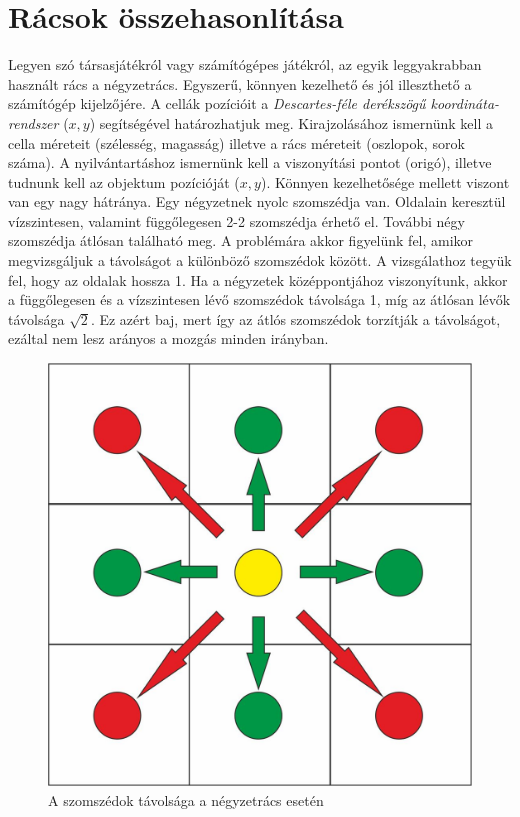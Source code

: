 
\section{Rácsok összehasonlítása}

Legyen szó társasjátékról vagy számítógépes játékról, az egyik leggyakrabban használt rács a négyzetrács. Egyszerű, könnyen kezelhető és jól illeszthető a számítógép kijelzőjére.
\newline A cellák pozícióit a \textit{Descartes-féle derékszögű koordináta-rendszer} ($x, y$) segítségével határozhatjuk meg. 
\newline Kirajzolásához ismernünk kell a cella méreteit (szélesség, magasság) illetve a rács méreteit (oszlopok, sorok száma). 
\newline A nyilvántartáshoz ismernünk kell a viszonyítási pontot (origó), illetve tudnunk kell az objektum pozícióját ($x, y$).
\newline
\newline Könnyen kezelhetősége mellett viszont van egy nagy hátránya.
Egy négyzetnek nyolc szomszédja van. Oldalain keresztül vízszintesen, valamint függőlegesen 2-2 szomszédja érhető el. További négy szomszédja átlósan található meg. A problémára akkor figyelünk fel, amikor megvizsgáljuk a távolságot a különböző szomszédok között. A vizsgálathoz tegyük fel, hogy az oldalak hossza 1. Ha a négyzetek középpontjához viszonyítunk, akkor a függőlegesen és a vízszintesen lévő szomszédok távolsága 1, míg az átlósan lévők távolsága $\sqrt{2}$. Ez azért baj, mert így az átlós szomszédok torzítják a távolságot, ezáltal nem lesz arányos a mozgás minden irányban.

\begin{figure}[h!]
\centering
\includegraphics[scale=0.4]{kepek/SqDistance.jpg}
\caption{A szomszédok távolsága a négyzetrács esetén}
\label{fig:SqDistance}
\end{figure}

